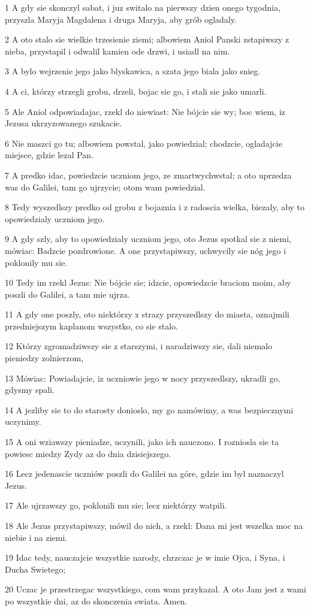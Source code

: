 \par 1 A gdy sie skonczyl sabat, i juz switalo na pierwszy dzien onego tygodnia, przyszla Maryja Magdalena i druga Maryja, aby grób ogladaly.
\par 2 A oto stalo sie wielkie trzesienie ziemi; albowiem Aniol Panski zstapiwszy z nieba, przystapil i odwalil kamien ode drzwi, i usiadl na nim.
\par 3 A bylo wejrzenie jego jako blyskawica, a szata jego biala jako snieg.
\par 4 A ci, którzy strzegli grobu, drzeli, bojac sie go, i stali sie jako umarli.
\par 5 Ale Aniol odpowiadajac, rzekl do niewiast: Nie bójcie sie wy; boc wiem, iz Jezusa ukrzyzowanego szukacie.
\par 6 Nie maszci go tu; albowiem powstal, jako powiedzial; chodzcie, ogladajcie miejsce, gdzie lezal Pan.
\par 7 A predko idac, powiedzcie uczniom jego, ze zmartwychwstal; a oto uprzedza was do Galilei, tam go ujrzycie; otom wam powiedzial.
\par 8 Tedy wyszedlszy predko od grobu z bojaznia i z radoscia wielka, biezaly, aby to opowiedzialy uczniom jego.
\par 9 A gdy szly, aby to opowiedzialy uczniom jego, oto Jezus spotkal sie z niemi, mówiac: Badzcie pozdrowione. A one przystapiwszy, uchwycily sie nóg jego i poklonily mu sie.
\par 10 Tedy im rzekl Jezus: Nie bójcie sie; idzcie, opowiedzcie braciom moim, aby poszli do Galilei, a tam mie ujrza.
\par 11 A gdy one poszly, oto niektórzy z strazy przyszedlszy do miasta, oznajmili przedniejszym kaplanom wszystko, co sie stalo.
\par 12 Którzy zgromadziwszy sie z starszymi, i naradziwszy sie, dali niemalo pieniedzy zolnierzom,
\par 13 Mówiac: Powiadajcie, iz uczniowie jego w nocy przyszedlszy, ukradli go, gdysmy spali.
\par 14 A jezliby sie to do starosty donioslo, my go namówimy, a was bezpiecznymi uczynimy.
\par 15 A oni wziawszy pieniadze, uczynili, jako ich nauczono. I rozniosla sie ta powiesc miedzy Zydy az do dnia dzisiejszego.
\par 16 Lecz jedenascie uczniów poszli do Galilei na góre, gdzie im byl naznaczyl Jezus.
\par 17 Ale ujrzawszy go, poklonili mu sie; lecz niektórzy watpili.
\par 18 Ale Jezus przystapiwszy, mówil do nich, a rzekl: Dana mi jest wszelka moc na niebie i na ziemi.
\par 19 Idac tedy, nauczajcie wszystkie narody, chrzczac je w imie Ojca, i Syna, i Ducha Swietego;
\par 20 Uczac je przestrzegac wszystkiego, com wam przykazal. A oto Jam jest z wami po wszystkie dni, az do skonczenia swiata. Amen.


